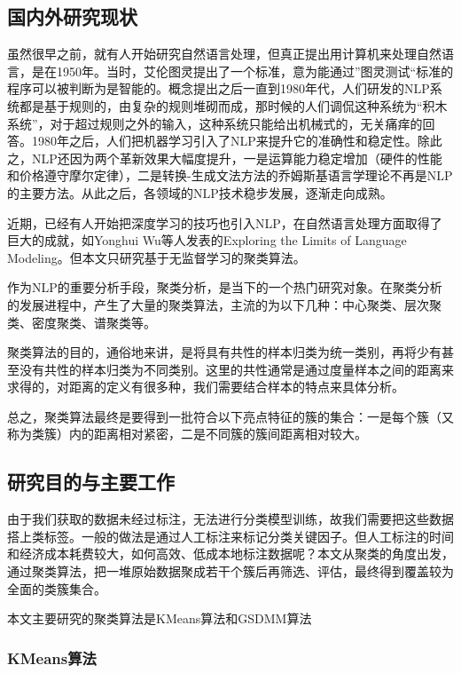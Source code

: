 \subsection{国内外研究现状}
虽然很早之前，就有人开始研究自然语言处理，但真正提出用计算机来处理自然语言，是在1950年。当时，艾伦图灵提出了一个标准，意为能通过”图灵测试“\cite{WEB:turing_test}标准的程序可以被判断为是智能的。概念提出之后一直到1980年代，人们研发的NLP系统都是基于规则的，由复杂的规则堆砌而成，那时候的人们调侃这种系统为“积木系统”，对于超过规则之外的输入，这种系统只能给出机械式的，无关痛痒的回答。1980年之后，人们把机器学习引入了NLP来提升它的准确性和稳定性。除此之，NLP还因为两个革新效果大幅度提升，一是运算能力稳定增加（硬件的性能和价格遵守摩尔定律），二是转换-生成文法方法的乔姆斯基语言学理论不再是NLP的主要方法\cite{WEB:turing_test}。从此之后，各领域的NLP技术稳步发展，逐渐走向成熟。

近期，已经有人开始把深度学习的技巧也引入NLP，在自然语言处理方面取得了巨大的成就，如Yonghui Wu等人发表的Exploring the Limits of Language Modeling\cite{DBLP:journals/corr/JozefowiczVSSW16}。但本文只研究基于无监督学习的聚类算法。

作为NLP的重要分析手段，聚类分析，是当下的一个热门研究对象。在聚类分析的发展进程中，产生了大量的聚类算法，主流的为以下几种：中心聚类、层次聚类、密度聚类、谱聚类等。

聚类算法的目的，通俗地来讲，是将具有共性的样本归类为统一类别，再将少有甚至没有共性的样本归类为不同类别。这里的共性通常是通过度量样本之间的距离来求得的，对距离的定义有很多种，我们需要结合样本的特点来具体分析。\cite{ZW:cluster_alg_study_compare}

总之，聚类算法最终是要得到一批符合以下亮点特征的簇的集合：一是每个簇（又称为类簇）内的距离相对紧密，二是不同簇的簇间距离相对较大。

\subsection{研究目的与主要工作}
由于我们获取的数据未经过标注，无法进行分类模型训练，故我们需要把这些数据搭上类标签。一般的做法是通过人工标注来标记分类关键因子。但人工标注的时间和经济成本耗费较大，如何高效、低成本地标注数据呢？本文从聚类的角度出发，通过聚类算法，把一堆原始数据聚成若干个簇后再筛选、评估，最终得到覆盖较为全面的类簇集合。

本文主要研究的聚类算法是KMeans\cite{Macqueen67somemethods}算法和GSDMM\cite{Yin:2014}算法

\subsubsection{KMeans算法}

